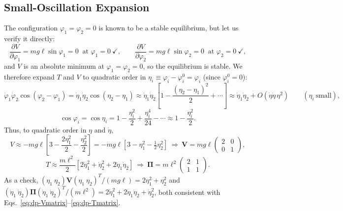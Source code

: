 \documentclass[11pt]{article}
\newcommand{\bV}{\mathbf{V}}
\newcommand{\bPi}{\bm{\Pi}}
\begin{document}
\subsection{Small-Oscillation Expansion}

The configuration $\varphi_1=\varphi_2=0$ is known to be a stable equilibrium, but let us verify it directly:
\begin{equation}
\frac{\partial V}{\partial\varphi_1} = mg\ell\sin\varphi_1 = 0 \ \text{ at } \varphi_1=0\ \checkmark, \qquad \frac{\partial V}{\partial\varphi_2} = mg\ell\sin\varphi_2 = 0 \ \text{ at }\varphi_2=0\ \checkmark,
\end{equation}
and $V$ is an absolute minimum at $\varphi_1=\varphi_2=0$, so the equilibrium is stable. We therefore expand $T$ and $V$ to quadratic order in $\eta_i \equiv \varphi_i-\varphi_i^0 = \varphi_i$ (since $\varphi_i^0=0$):
\begin{equation}
\dot\varphi_1\dot\varphi_2\cos(\varphi_2-\varphi_1) = \dot\eta_1\dot\eta_2\cos(\eta_2-\eta_1) \approx \dot\eta_1\dot\eta_2\left[1-\frac{(\eta_2-\eta_1)^2}{2}+\cdots\right] \approx \dot\eta_1\dot\eta_2 + O(\dot\eta\dot\eta\,\eta^2) \qquad (\eta_i\ \text{small}),
\end{equation}
\begin{equation}
\cos\varphi_i = \cos\eta_i = 1-\frac{\eta_i^2}{2}+\frac{\eta_i^4}{24}-\cdots \approx 1-\frac{\eta_i^2}{2}.
\end{equation}
Thus, to quadratic order in $\eta$ and $\dot\eta$,
\begin{equation}
V \approx -mg\ell\left[3-\frac{2\eta_1^2}{2}-\frac{\eta_2^2}{2}\right] = -mg\ell\left[3-\eta_1^2-\tfrac12\eta_2^2\right] \ \Longrightarrow\ \boxed{\bV = mg\ell\begin{pmatrix}2&0\\0&1\end{pmatrix},}
\label{eq:dp-Vmatrix}
\end{equation}
\begin{equation}
T \approx \frac{m\ell^2}{2}\left[2\dot\eta_1^2+\dot\eta_2^2+2\dot\eta_1\dot\eta_2\right] \ \Longrightarrow\ \boxed{\bPi = m\ell^2\begin{pmatrix}2&1\\1&1\end{pmatrix}.}
\label{eq:dp-Tmatrix}
\end{equation}
As a check, $(\eta_1\ \eta_2)\bV(\eta_1\ \eta_2)^T/(mg\ell) = 2\eta_1^2+\eta_2^2$ and $(\dot\eta_1\ \dot\eta_2)\bPi(\dot\eta_1\ \dot\eta_2)^T/(m\ell^2)=2\dot\eta_1^2+2\dot\eta_1\dot\eta_2+\dot\eta_2^2$, both consistent with Eqs.~\eqref{eq:dp-Vmatrix}--\eqref{eq:dp-Tmatrix}.
\end{document}
